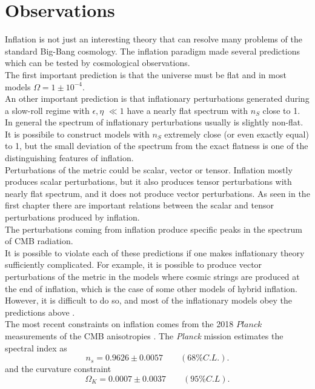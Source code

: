 \documentclass[11pt,a4paper,twoside]{book}
\begin{document}
\section{Observations}
Inflation is not just an interesting theory  that can resolve many problems of the standard Big-Bang cosmology. The inflation paradigm made several predictions which can be tested by cosmological observations.\\
The first important prediction is that the universe must be flat and in most models $ \Omega = 1 \pm 10^{-4} $.\\
 An other important prediction is that  inflationary perturbations generated during a slow-roll regime with $\epsilon,\eta$ $\ll 1$ have a nearly flat spectrum with $ n_{S}$ close to 1. In general the spectrum of inflationary perturbations usually is slightly non-flat. It is possibile to construct models with $ n_{S}$ extremely close (or even exactly equal) to 1, but the small deviation of the spectrum from the exact flatness is one of the distinguishing features of inflation.\\
 Perturbations of the metric could be scalar, vector or tensor. Inflation mostly produces scalar perturbations, but it also produces tensor perturbations with nearly flat spectrum, and it does not produce vector perturbations. As seen in the first chapter  there are important relations between the scalar and tensor perturbations produced by inflation.\\
 The perturbations coming from inflation produce specific peaks in the spectrum of CMB radiation.\\
 It is possible to violate each of these predictions if one makes inflationary theory sufficiently complicated. For example, it is possible to produce vector perturbations of the metric in the models where cosmic strings are produced at the end of inflation, which is the case of some other models of hybrid inflation. However, it is difficult to do so, and most of the inflationary models obey the predictions above \cite{Chap2:Linde_HystoryInflation}.\\
 The most recent constraints on inflation comes from the 2018 $ Planck $ measurements of the CMB anisotropies \cite{Chap2:Planck2018}. The \textit{Planck} mission estimates the spectral index as
 \begin{equation}
 	\label{spectral index}
 	n_{s}= 0.9626 \pm 0.0057  \qquad (68\% C.L.).
 \end{equation}
and the curvature constraint
 \begin{equation}
 	\label{curvatureConstraint}
 	\Omega_{K}= 0.0007 \pm 0.0037 \qquad  (95\% C.L). 
 \end{equation}
\end{document}
